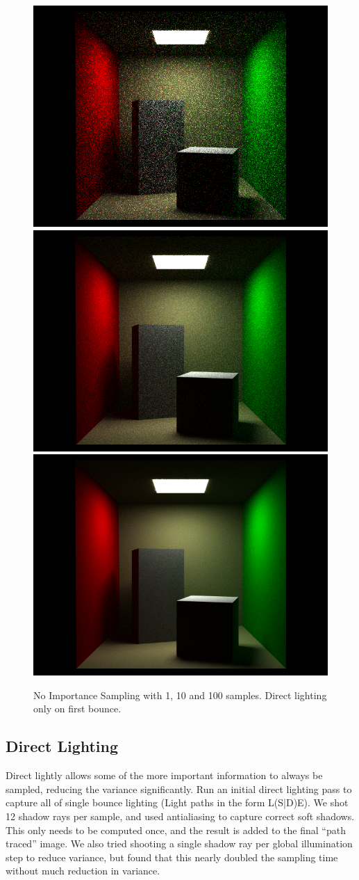 \documentclass[11pt]{article}
\begin{document}
\begin{figure}
  \begin{center}
    \includegraphics[width=.4\linewidth]{figs/noimpsample1cornell_low}
    \includegraphics[width=.4\linewidth]{figs/noimpsample10cornell_low}
    \includegraphics[width=.4\linewidth]{figs/noimpsample100cornell_low}
  \end{center}
  \caption{No Importance Sampling with 1, 10 and 100 samples. Direct lighting only on first bounce.}
\end{figure}
\subsection{Direct Lighting}
Direct lightly allows some of the more important information to always be sampled, reducing the variance significantly. Run an initial direct lighting pass to capture all of single bounce lighting (Light paths in the form L(S|D)E). We shot 12 shadow rays per sample, and used antialiasing to capture correct soft shadows. This only needs to be computed once, and the result is added to the final ``path traced'' image. We also tried shooting a single shadow ray per global illumination step to reduce variance, but found that this nearly doubled the sampling time without much reduction in variance. 
\end{document}
